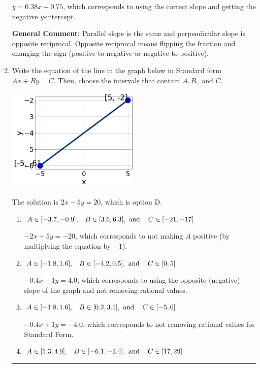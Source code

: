 \documentclass{extbook}[14pt]
\newcommand{\litem}[1]{\item #1

\rule{\textwidth}{0.4pt}}
\begin{document}
\begin{enumerate}
{\begin{enumerate}[label=\Alph*.]
 $y = 0.38x + 0.75$, which corresponds to using the correct slope and getting the negative $y$-intercept.
\end{enumerate}

\textbf{General Comment:} Parallel slope is the same and perpendicular slope is opposite reciprocal. Opposite reciprocal means flipping the fraction and changing the sign (positive to negative or negative to positive).
}
\litem{
Write the equation of the line in the graph below in Standard form $Ax+By=C$. Then, choose the intervals that contain $A, B, \text{ and } C$.

\begin{center}
    \includegraphics[width=0.5\textwidth]{../Figures/linearGraphToStandardA.png}
\end{center}


The solution is \( 2x - 5y = 20 \), which is option D.\begin{enumerate}[label=\Alph*.]
\item \( A \in [-3.7, -0.9], \hspace{3mm} B \in [3.6, 6.3], \text{ and } \hspace{3mm} C \in [-21, -17] \)

 $-2x + 5y = -20$, which corresponds to not making $A$ positive (by multiplying the equation by $-1$).
\item \( A \in [-1.8, 1.6], \hspace{3mm} B \in [-4.2, 0.5], \text{ and } \hspace{3mm} C \in [0, 5] \)

 $-0.4x - 1y = 4.0$, which corresponds to using the opposite (negative) slope of the graph and not removing rational values.
\item \( A \in [-1.8, 1.6], \hspace{3mm} B \in [0.2, 3.1], \text{ and } \hspace{3mm} C \in [-5, 0] \)

 $-0.4x + 1y = -4.0$, which corresponds to not removing rational values for Standard Form.
\item \( A \in [1.3, 4.9], \hspace{3mm} B \in [-6.1, -3.4], \text{ and } \hspace{3mm} C \in [17, 29] \)


\end{enumerate}}
\end{enumerate}
\end{document}
